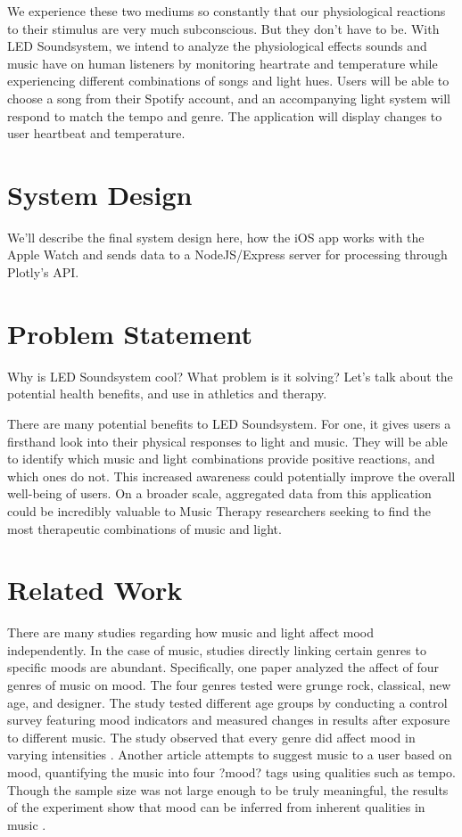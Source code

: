 \documentclass[11pt]{article}
\begin{document}
We experience these two mediums so constantly that our physiological reactions to their stimulus are very much subconscious. But they don't have to be. With LED Soundsystem, we intend to analyze the physiological effects sounds and music have on human listeners by monitoring heartrate and temperature while experiencing different combinations of songs and light hues. Users will be able to choose a song from their Spotify account, and an accompanying light system will respond to match the tempo and genre. The application will display changes to user heartbeat and temperature. 

\section{System Design}
We'll describe the final system design here, how the iOS app works with the Apple Watch and sends data to a NodeJS/Express server for processing through Plotly's API.

\section{Problem Statement}

Why is LED Soundsystem cool? What problem is it solving? Let's talk about the potential health benefits, and use in athletics and therapy.

There are many potential benefits to LED Soundsystem. For one, it gives users a firsthand look into their physical responses to light and music. They will be able to identify which music and light combinations provide positive reactions, and which ones do not. This increased awareness could potentially improve the overall well-being of users. On a broader scale, aggregated data from this application could be incredibly valuable to Music Therapy researchers seeking to find the most therapeutic combinations of music and light.

\section{Related Work}
There are many studies regarding how music and light affect mood independently. In the case of music, studies directly linking certain genres to specific moods are abundant. Specifically, one paper analyzed the affect of four genres of music on mood. The four genres tested were grunge rock, classical, new age, and designer. The study tested different age groups by conducting a control survey featuring mood indicators and measured changes in results after exposure to different music. The study observed that every genre did affect mood in varying intensities \cite {mccraty}. Another article attempts to suggest music to a user based on mood, quantifying the music into four ?mood? tags using qualities such as tempo. Though the sample size was not large enough to be truly meaningful, the results of the experiment show that mood can be inferred from inherent qualities in music \cite {feng}. 
\end{document}
